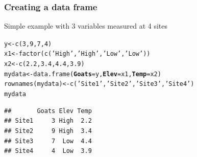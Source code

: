 \documentclass[color=usenames,dvipsnames]{beamer}\usepackage[]{graphicx}\usepackage[]{color}
\makeatletter
\newcommand{\hlnum}[1]{\textcolor[rgb]{0.69,0.494,0}{#1}}%
\newcommand{\hlstr}[1]{\textcolor[rgb]{0.749,0.012,0.012}{#1}}%
\newcommand{\hlstd}[1]{\textcolor[rgb]{0,0,0}{#1}}%
\newcommand{\hlkwb}[1]{\textcolor[rgb]{0,0.341,0.682}{#1}}%
\newcommand{\hlkwc}[1]{\textcolor[rgb]{0,0,0}{\textbf{#1}}}%
\newcommand{\hlkwd}[1]{\textcolor[rgb]{0.004,0.004,0.506}{#1}}%
\newenvironment{kframe}{%
 \def\at@end@of@kframe{}%
 \ifinner\ifhmode%
  \def\at@end@of@kframe{\end{minipage}}%
  \begin{minipage}{\columnwidth}%
 \fi\fi%
 \def\FrameCommand##1{\hskip\@totalleftmargin \hskip-\fboxsep
 \colorbox{shadecolor}{##1}\hskip-\fboxsep
     \hskip-\linewidth \hskip-\@totalleftmargin \hskip\columnwidth}%
 \MakeFramed {\advance\hsize-\width
   \@totalleftmargin\z@ \linewidth\hsize
   \@setminipage}}%
 {\par\unskip\endMakeFramed%
 \at@end@of@kframe}
\newenvironment{knitrout}{}{} %
\makeatother
\begin{document}
\begin{frame}[fragile]
  \frametitle{Creating a data frame}
  {Simple example with 3 variables measured at 4 sites}
\begin{knitrout}\small
{}\color{fgcolor}\begin{kframe}
\begin{alltt}
\hlstd{y} \hlkwb{<-} \hlkwd{c}\hlstd{(}\hlnum{3}\hlstd{,} \hlnum{9}\hlstd{,} \hlnum{7}\hlstd{,} \hlnum{4}\hlstd{)}
\hlstd{x1} \hlkwb{<-} \hlkwd{factor}\hlstd{(}\hlkwd{c}\hlstd{(}\hlstr{'High'}\hlstd{,} \hlstr{'High'}\hlstd{,} \hlstr{'Low'}\hlstd{,} \hlstr{'Low'}\hlstd{))}
\hlstd{x2} \hlkwb{<-} \hlkwd{c}\hlstd{(}\hlnum{2.2}\hlstd{,} \hlnum{3.4}\hlstd{,} \hlnum{4.4}\hlstd{,} \hlnum{3.9}\hlstd{)}
\hlstd{mydata} \hlkwb{<-} \hlkwd{data.frame}\hlstd{(}\hlkwc{Goats}\hlstd{=y,} \hlkwc{Elev}\hlstd{=x1,} \hlkwc{Temp}\hlstd{=x2)}
\hlkwd{rownames}\hlstd{(mydata)} \hlkwb{<-} \hlkwd{c}\hlstd{(}\hlstr{'Site1'}\hlstd{,} \hlstr{'Site2'}\hlstd{,} \hlstr{'Site3'}\hlstd{,} \hlstr{'Site4'}\hlstd{)}
\hlstd{mydata}
\end{alltt}
\begin{verbatim}
##       Goats Elev Temp
## Site1     3 High  2.2
## Site2     9 High  3.4
## Site3     7  Low  4.4
## Site4     4  Low  3.9
\end{verbatim}
\end{kframe}
\end{knitrout}
\end{frame}
\end{document}

